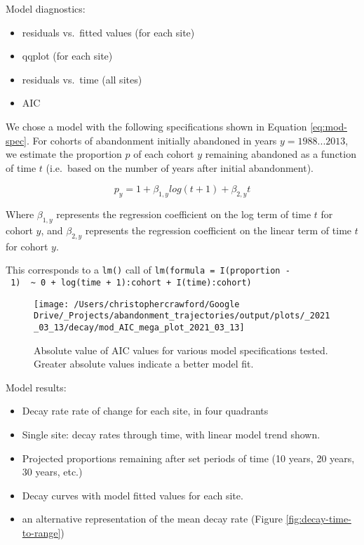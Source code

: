 \documentclass[
]{article}
\providecommand{\tightlist}{%
  \setlength{\itemsep}{0pt}\setlength{\parskip}{0pt}}
\begin{document}
Model diagnostics:

\begin{itemize}
\tightlist
\item
  residuals vs.~fitted values (for each site)
\item
  qqplot (for each site)
\item
  residuals vs.~time (all sites)
\item
  AIC
\end{itemize}

We chose a model with the following specifications shown in Equation \eqref{eq:mod-spec}.
For cohorts of abandonment initially abandoned in years \(y = 1988 ... 2013\), we estimate the proportion \(p\) of each cohort \(y\) remaining abandoned as a function of time \(t\) (i.e.~based on the number of years after initial abandonment).

\begin{equation}
p_{y} = 1 + \beta_{1,y} log(t + 1) + \beta_{2,y} t \label{eq:mod-spec}
\end{equation}

Where \(\beta_{1,y}\) represents the regression coefficient on the log term of time \(t\) for cohort \(y\), and \(\beta_{2,y}\) represents the regression coefficient on the linear term of time \(t\) for cohort \(y\).

This corresponds to a \texttt{lm()} call of \texttt{lm(formula\ =\ I(proportion\ -\ 1)\ \ \textasciitilde{}\ 0\ +\ log(time\ +\ 1):cohort\ +\ I(time):cohort)}



\begin{figure}
\texttt{[image: /Users/christophercrawford/Google Drive/\_Projects/abandonment\_trajectories/output/plots/\_2021\_03\_13/decay/mod\_AIC\_mega\_plot\_2021\_03\_13]} \caption{Absolute value of AIC values for various model specifications tested. Greater absolute values indicate a better model fit.}\label{fig:AIC}
\end{figure}



Model results:

\begin{itemize}
\tightlist
\item
  Decay rate rate of change for each site, in four quadrants
\item
  Single site: decay rates through time, with linear model trend shown.
\item
  Projected proportions remaining after set periods of time (10 years, 20 years, 30 years, etc.)
\item
  Decay curves with model fitted values for each site.
\item
  an alternative representation of the mean decay rate (Figure \ref{fig:decay-time-to-range})
\end{itemize}
\end{document}

